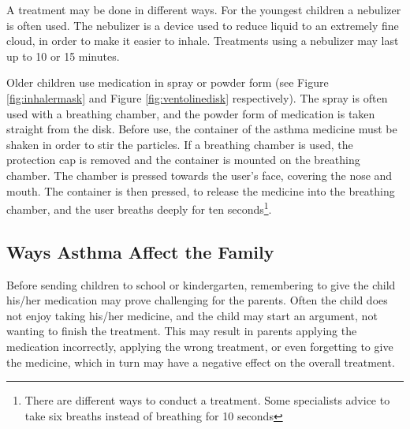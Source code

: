 A treatment may be done in different ways. For the youngest children a nebulizer is often used. The nebulizer is a device used to reduce liquid to an extremely fine cloud, in order to make it easier to inhale. Treatments using a nebulizer may last up to 10 or 15 minutes.

Older children use medication in spray or powder form (see Figure \ref{fig:inhalermask} and Figure \ref{fig:ventolinedisk} respectively). The spray is often used with a breathing chamber, and the powder form of medication is taken straight from the disk. Before use, the container of the asthma medicine must be shaken in order to stir the particles. If a breathing chamber is used, the protection cap is removed and the container is mounted on the breathing chamber. The chamber is pressed towards the user's face, covering the nose and mouth. The container is then pressed, to release the medicine into the breathing chamber, and the user breaths deeply for ten seconds\footnote{There are different ways to conduct a treatment. Some specialists advice to take six breaths instead of breathing for 10 seconds}. 

\subsection{Ways Asthma Affect the Family}
\label{sec:waysasthmaaffectthefamily}
Before sending children to school or kindergarten, remembering to give the child his/her medication may prove challenging for the parents. Often the child does not enjoy taking his/her medicine, and the child may start an argument, not wanting to finish the treatment. This may result in parents applying the medication incorrectly, applying the wrong treatment, or even forgetting to give the medicine, which in turn may have a negative effect on the overall treatment.  

